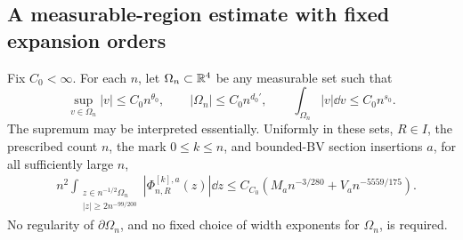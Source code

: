 \subsection{A measurable-region estimate with fixed expansion orders}
\begin{theorem}
\label{thm:shape-volume-criterion}
Fix $C_0<\infty$. For each $n$, let $\Omega_n\subset\mathbb R^4$ be any
measurable set such that
\begin{equation}\label{eq:shape-volume-hypotheses}
 \sup_{v\in\Omega_n}|v|\le C_0 n^{\theta_0},\qquad
 |\Omega_n|\le C_0 n^{d_0'},\qquad
 \int_{\Omega_n}|v|\dd v\le C_0 n^{s_0}.
\end{equation}
The supremum may be interpreted essentially. Uniformly in these sets,
$R\in I$, the prescribed count $n$, the mark $0\le k\le n$, and
bounded-BV section insertions $a$, for all sufficiently large $n$,
\begin{align}
 &n^2\int_{\substack{z\in n^{-1/2}\Omega_n\\
                             |z|\ge2n^{-99/200}}}
           |\Phi^{[k],a}_{n,R}(z)|\dd z
 \le C_{C_0}\left(M_a n^{-3/280}+V_a n^{-5559/175}\right).
 \label{eq:shape-volume-cancellation}
\end{align}
No regularity of $\partial\Omega_n$, and no fixed choice of width
exponents for $\Omega_n$, is required.
\end{theorem}
